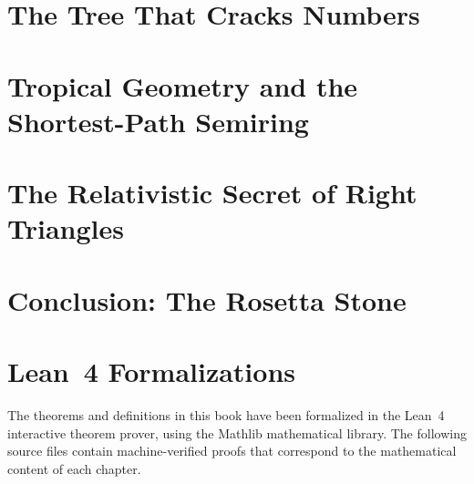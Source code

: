 \documentclass[11pt,openright,twoside,extrafontsizes]{memoir}
\theoremstyle{definition}
\begin{document}
\chapter{The Tree That Cracks Numbers}


\chapter{Tropical Geometry and the Shortest-Path Semiring}


\chapter{The Relativistic Secret of Right Triangles}


\chapter*{Conclusion: The Rosetta Stone}


\backmatter

\appendix
\chapter{Lean~4 Formalizations}

The theorems and definitions in this book have been formalized in the
Lean~4 interactive theorem prover, using the Mathlib mathematical library.
The following source files contain machine-verified proofs that correspond
to the mathematical content of each chapter.

\vspace{6pt}



\printindex
\end{document}
